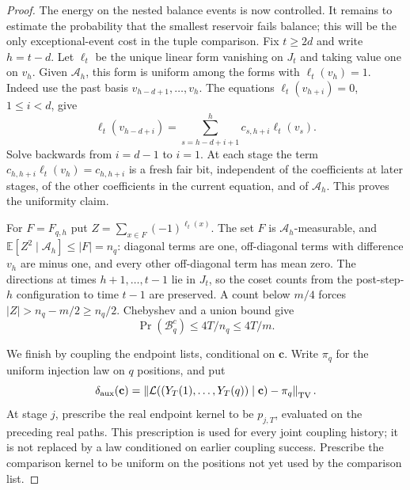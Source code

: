 \begin{proof}
The energy on the nested balance events is now controlled. It remains
to estimate the probability that the smallest reservoir fails balance;
this will be the only exceptional-event cost in the tuple comparison.
Fix $t\ge2d$ and write $h=t-d$.
Let $\ell_t$ be the unique linear form vanishing on $J_t$ and taking
value one on $v_h$. Given $\mathcal A_h$, this form
is uniform among the forms with $\ell_t(v_h)=1$.
Indeed use the past basis $v_{h-d+1},\ldots,v_h$. The equations
$\ell_t(v_{h+i})=0$, $1\le i<d$, give
\[
 \ell_t(v_{h-d+i})
 =\sum_{s=h-d+i+1}^{h}c_{s,h+i}\ell_t(v_s).
\]
Solve backwards from $i=d-1$ to $i=1$. At each stage the term
$c_{h,h+i}\ell_t(v_h)=c_{h,h+i}$ is a fresh fair bit, independent of
the coefficients at later stages, of the other coefficients in the
current equation, and of $\mathcal A_h$. This proves the
uniformity claim.

For $F=F_{q,h}$ put $Z=\sum_{x\in F}(-1)^{\ell_t(x)}$.
The set $F$ is $\mathcal A_h$-measurable, and
$\mathbb E[Z^2\mid\mathcal A_h]\le|F|=n_q$: diagonal terms are one, off-diagonal terms
with difference $v_h$ are minus one, and every other off-diagonal term
has mean zero. The directions at times $h+1,\ldots,t-1$ lie in $J_t$,
so the coset counts from the post-step-$h$ configuration to time $t-1$
are preserved. A count below $m/4$ forces
$|Z|>n_q-m/2\ge n_q/2$. Chebyshev and a union bound give
\begin{equation}
 \Pr(\mathcal B_q^c)\le4T/n_q\le4T/m.
 \label{frames:stopped-bad}
\end{equation}

We finish by coupling the endpoint lists, conditional on $\mathbf c$.
Write $\pi_q$ for the uniform injection law on $q$ positions, and put
\[
 \delta_{\rm aux}(\mathbf c)
 =\left\|\mathcal L((Y_T(1),\ldots,Y_T(q))\mid\mathbf c)-\pi_q
       \right\|_{\rm TV}.
\]
At stage $j$, prescribe the real endpoint kernel to be $p_{j,T}$,
evaluated on the preceding real paths. This prescription is used
for every joint coupling history; it is not replaced by a law conditioned
on earlier coupling success. Prescribe the comparison kernel to be
uniform on the positions not yet used by the comparison list.


\end{proof}
